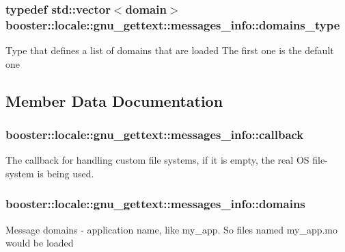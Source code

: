 \subsubsection[{domains\-\_\-type}]{\setlength{\rightskip}{0pt plus 5cm}typedef std\-::vector$<${\bf domain}$>$ {\bf booster\-::locale\-::gnu\-\_\-gettext\-::messages\-\_\-info\-::domains\-\_\-type}}\label{structbooster_1_1locale_1_1gnu__gettext_1_1messages__info_ac45a61d428200334bd0c1fa05d8ee430}
Type that defines a list of domains that are loaded The first one is the default one 

\subsection{Member Data Documentation}
\subsubsection[{callback}]{ booster\-::locale\-::gnu\-\_\-gettext\-::messages\-\_\-info\-::callback}\label{structbooster_1_1locale_1_1gnu__gettext_1_1messages__info_a36951144ac6a71cdca5cc11a8e53f681}
The callback for handling custom file systems, if it is empty, the real O\-S file-\/system is being used. 
\subsubsection[{domains}]{ booster\-::locale\-::gnu\-\_\-gettext\-::messages\-\_\-info\-::domains}\label{structbooster_1_1locale_1_1gnu__gettext_1_1messages__info_a1571eeef85b4728d5f143134c65a0b2c}
Message domains -\/ application name, like my\-\_\-app. So files named my\-\_\-app.\-mo would be loaded 
